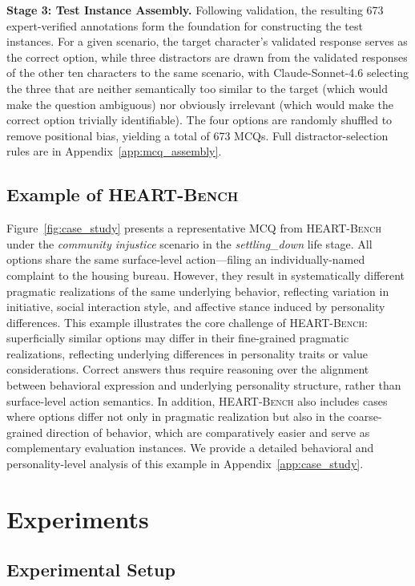 \documentclass{article}
\newcommand{\ourbench}[0]{\textsc{HEART-Bench}\xspace}
\begin{document}
\textbf{Stage 3: Test Instance Assembly.}
Following validation, the resulting 673 expert-verified annotations form the foundation for constructing the test instances. For a given scenario, the target character's validated response serves as the correct option, while three distractors are drawn from the validated responses of the other ten characters to the same scenario, with Claude-Sonnet-4.6 selecting the three that are neither semantically too similar to the target (which would make the question ambiguous) nor obviously irrelevant (which would make the correct option trivially identifiable). The four options are randomly shuffled to remove positional bias, yielding a total of 673 MCQs. Full distractor-selection rules are in Appendix~\ref{app:mcq_assembly}.

\label{gen_inst}

\subsection{Example of \ourbench}
Figure~\ref{fig:case_study} presents a representative MCQ from \ourbench under the \emph{community injustice} scenario in the \emph{settling\_down} life stage. All options share the same surface-level action---filing an individually-named complaint to the housing bureau. However, they result in systematically different pragmatic realizations of the same underlying behavior, reflecting variation in initiative, social interaction style, and affective stance induced by personality differences. This example illustrates the core challenge of \ourbench: superficially similar options may differ in their fine-grained pragmatic realizations, reflecting underlying differences in personality traits or value considerations. Correct answers thus require reasoning over the alignment between behavioral expression and underlying personality structure, rather than surface-level action semantics. In addition, \ourbench also includes cases where options differ not only in pragmatic realization but also in the coarse-grained direction of behavior, which are comparatively easier and serve as complementary evaluation instances. We provide a detailed behavioral and personality-level analysis of this example in Appendix~\ref{app:case_study}.

\section{Experiments}

\subsection{Experimental Setup}
\end{document}
